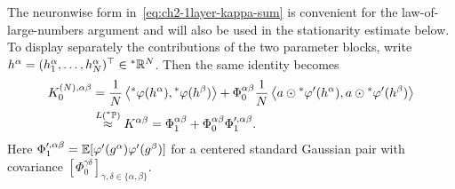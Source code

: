 \begin{proofsketch}
The neuronwise form in~\eqref{eq:ch2-1layer-kappa-sum} is convenient for the law-of-large-numbers argument and will also be used in the stationarity estimate below. To display separately the contributions of the two parameter blocks, write $h^\alpha = (h_1^\alpha, \dots, h_N^\alpha)^\top \in {}^*\mathbb{R}^N$. Then the same identity becomes
\begin{equation}\label{eq:ch2-1layer-block-ntk}
\begin{aligned}
K_0^{(N),\alpha\beta} &= \frac{1}{N} \left\langle {}^*\varphi(h^\alpha), {}^*\varphi(h^\beta) \right\rangle + \Phi_0^{\alpha\beta} \frac{1}{N} \left\langle a \odot {}^*\varphi'(h^\alpha), a \odot {}^*\varphi'(h^\beta) \right\rangle \\
&\stackrel{L({}^*\mathbb{P})}{\approx} K^{\alpha\beta} = \Phi_1^{\alpha\beta} + \Phi_0^{\alpha\beta} \Phi_1^{\prime,\alpha\beta}.
\end{aligned}
\end{equation}
Here $\Phi_1^{\prime,\alpha\beta} = \mathbb{E}[\varphi'(g^\alpha)\varphi'(g^\beta)]$ for a centered standard Gaussian pair with covariance $[\Phi_0^{\gamma\delta}]_{\gamma,\delta \in \{\alpha, \beta\}}$.


\end{proofsketch}
